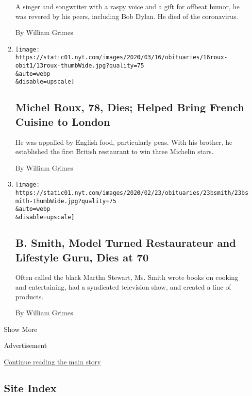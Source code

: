 \begin{enumerate}
  A singer and songwriter with a raspy voice and a gift for offbeat
  humor, he was revered by his peers, including Bob Dylan. He died of
  the coronavirus.

  By William Grimes
\item
  \href{/2020/03/14/obituaries/michel-roux-dead.html}{}

  \texttt{[image: https://static01.nyt.com/images/2020/03/16/obituaries/16roux-obit1/13roux-thumbWide.jpg?quality=75\\\&auto=webp\\\&disable=upscale]}

  \hypertarget{michel-roux-78-dies-helped-bring-french-cuisine-to-london}{%
  \subsection{Michel Roux, 78, Dies; Helped Bring French Cuisine to
  London}\label{michel-roux-78-dies-helped-bring-french-cuisine-to-london}}

  He was appalled by English food, particularly peas. With his brother,
  he established the first British restaurant to win three Michelin
  stars.

  By William Grimes
\item
  \href{/2020/02/23/obituaries/b-smith-dead.html}{}

  \texttt{[image: https://static01.nyt.com/images/2020/02/23/obituaries/23bsmith/23bsmith-thumbWide.jpg?quality=75\\\&auto=webp\\\&disable=upscale]}

  \hypertarget{b-smith-model-turned-restaurateur-and-lifestyle-guru-dies-at-70}{%
  \subsection{B. Smith, Model Turned Restaurateur and Lifestyle Guru,
  Dies at
  70}\label{b-smith-model-turned-restaurateur-and-lifestyle-guru-dies-at-70}}

  Often called the black Martha Stewart, Ms. Smith wrote books on
  cooking and entertaining, had a syndicated television show, and
  created a line of products.

  By William Grimes
\end{enumerate}

Show More

Advertisement

\protect\hyperlink{after-mid2}{Continue reading the main story}

\hypertarget{site-index}{%
\subsection{Site Index}\label{site-index}}

